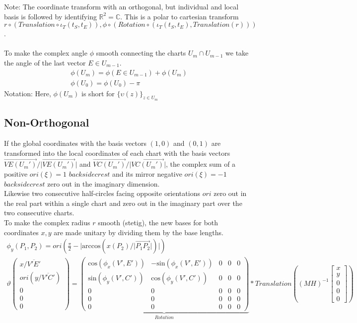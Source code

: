 \documentclass{report}
\begin{document}
Note: The coordinate transform with an orthogonal, but individual and local basis is followed by identifying $\mathbb{R}^2=\mathbb{C}$. This is a polar to cartesian transform $r\circ (Translation\circ \iota_{T}(t_{S},t_{E})),\phi \circ (Rotation\circ (\iota_{T}(t_{S},t_{E}),Translation(r)))$.\\\\
To make the complex angle $\phi$ smooth connecting the charts $U_{m}\cap U_{m-1}$ we take the angle of the last vector $E\in U_{m-1}$.
\begin{align}
\phi (U_{m}) = \phi (E \in U_{m-1})+\phi(U_{m})\\
\phi (U_{0})=\phi(U_{0}) -\pi
\end{align}
Notation: Here, $\phi (U_{m})$ is short for $\{\upsilon (z) \}_{z \in U_{m}}$
\subsection{Non-Orthogonal}
If the global coordinates with the basis vectors $(1,0)$ and $(0,1)$ are transformed into the local coordinates of each chart with the basis vectors $\overrightarrow{VE(U_{m}')}/\lvert \overrightarrow{VE(U_{m}')}\rvert$ and $\overrightarrow{VC(U_{m}')}/\lvert \overrightarrow{VC(U_{m}')}\rvert$, the complex sum of a positive $ori(\xi)=1$ $backsidecrest$ and its mirror negative $ori(\xi)=-1$ $backsidecrest$ zero out in the imaginary dimension.\\
Likewise two consecutive half-circles facing opposite orientations $ori$ zero out in the real part within a single chart and zero out in the imaginary part over the two consecutive charts.\\
To make the complex radius $r$ smooth (stetig), the new bases for both coordinates $x,y$ are made unitary by dividing them by the base lengths.
\begin{align}
\phi_{y}(P_{1},P_{2}) = ori(\frac{\pi}{2}-\lvert \mathrm{arccos}(x(P_{2})/\lvert \overrightarrow{P_{1}P_{2}}\rvert)\rvert)\\
\vartheta
\begin{pmatrix}x/\overline{V'E'} \\ ori(y/\overline{V'C'}) \\ 0 \\ 0 \\ 0\end{pmatrix}=
\underbrace{
\begin{pmatrix}
\mathrm{cos}(\phi_{x}(V',E')) & -\mathrm{sin}(\phi_{x}(V',E')) & 0 & 0 & 0 \\
\mathrm{sin}(\phi_{y}(V',C')) & \mathrm{cos}(\phi_{y}(V',C')) & 0 & 0 & 0 \\
0 & 0 & 0 & 0 & 0 \\
0 & 0 & 0 & 0 & 0 \\
0 & 0 & 0 & 0 & 0
\end{pmatrix}
}_{Rotation}*
Translation((MH)^{-1}\begin{bmatrix} x \\ y \\ 0 \\ 0 \\ 0 \end{bmatrix})
\end{align}
\end{document}
